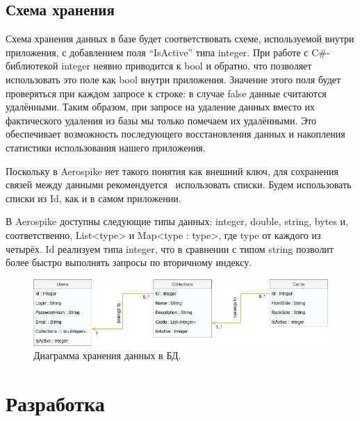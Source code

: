 \documentclass[14pt]{matmex-diploma-custom}
\begin{document}
\subsection{Схема хранения} \label{storage}
Схема хранения данных в базе будет соответствовать схеме, используемой внутри приложения, с добавлением поля ``IsActive'' типа integer. При работе с C\#-библиотекой integer неявно приводится к bool и обратно, что позволяет использовать это поле как bool внутри приложения. Значение этого поля будет проверяться при каждом запросе к строке: в случае false данные считаются удалёнными. Таким образом, при запросе на удаление данных вместо их фактического удаления из базы мы только помечаем их удалёнными. Это обеспечивает возможность последующего восстановления данных и накопления статистики использования нашего приложения.

Поскольку в Aerospike нет такого понятия как внешний ключ, для сохранения связей между данными рекомендуется~\cite{aero:foreign} использовать списки. Будем использовать списки из Id, как и в самом приложении.

В Aerospike доступны следующие типы данных: integer, double, string, bytes и, соответственно, List<type> и Map<type : type>, где type от каждого из четырёх.
Id реализуем типа integer, что в сравнении с типом string позволит более быстро выполнять запросы по вторичному индексу.

\begin{figure}[ht]
    \includegraphics[width=\textwidth]{DB_layout}
    \caption{Диаграмма хранения данных в БД.}
    \label{fig:database}
\end{figure}

\section{Разработка}
\end{document}
